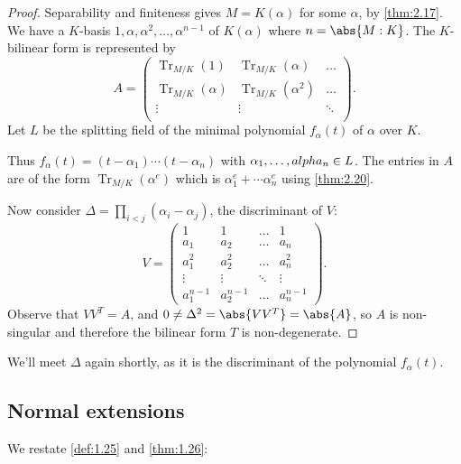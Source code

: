 \documentclass{article}
\DeclareMathOperator{\Tr}{Tr}
\begin{document}
\begin{proof}
    Separability and finiteness gives $M=K(\alpha)$ for some $\alpha$, by \cref{thm:2.17}.
    We have a $K$-basis $1, \alpha, \alpha^2, \dotsc, \alpha^{n-1}$ of $K(\alpha)$ where $n = \abs{M:K}$.
    The $K$-bilinear form is represented by
    \begin{equation*}
        A =
        \begin{pmatrix}
            \Tr_{M/K}(1)      & \Tr_{M/K}(\alpha)   & \dots  \\
            \Tr_{M/K}(\alpha) & \Tr_{M/K}(\alpha^2) & \dots  \\
            \vdots            & \vdots              & \ddots \\
        \end{pmatrix}.
    \end{equation*}
    Let $L$ be the splitting field of the minimal polynomial $f_\alpha(t)$ of $\alpha$ over $K$.

    Thus $f_\alpha(t) = (t-\alpha_1) \dotsm (t-\alpha_n)$ with $\alpha_1, \dotsc, \\alpha_n \in L$.
    The entries in $A$ are of the form $\Tr_{M/K}(\alpha^e)$ which is $\alpha_1^e + \dotsb \alpha_n^e$ using \cref{thm:2.20}.

    Now consider $\Delta = \prod_{i < j} (\alpha_i - \alpha_j)$, the discriminant of $V$:
    \begin{equation*}
        V =
        \begin{pmatrix}
            1 & 1 & \dots & 1 \\
            a_1 & a_2 & \dots & a_n \\
            a_1^2 & a_2^2 & \dots & a_n^2 \\
            \vdots & \vdots & \ddots & \vdots \\
            a_1^{n-1} & a_2^{n-1} & \dots & a_n^{n-1}
        \end{pmatrix}.
    \end{equation*}
    Observe that $V V^T = A$, and $0 \neq \Delta^2 = \abs{V V^T} = \abs{A}$, so $A$ is non-singular and therefore the bilinear form $T$ is non-degenerate.
\end{proof}

\begin{remark}
    We'll meet $\Delta$ again shortly, as it is the discriminant of the polynomial $f_\alpha(t)$.
\end{remark}

\subsection{Normal extensions}
We restate \cref{def:1.25} and \cref{thm:1.26}:
\end{document}
